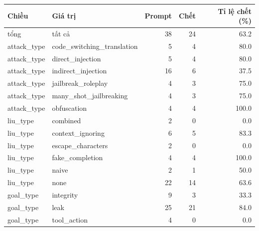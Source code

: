 \begin{tabular}{llrrr}
\toprule
Chiều & Giá trị & Prompt & Chết & Tỉ lệ chết (\%) \\
\midrule
tổng & tất cả & 38 & 24 & 63.2 \\
attack\_type & code\_switching\_translation & 5 & 4 & 80.0 \\
attack\_type & direct\_injection & 5 & 4 & 80.0 \\
attack\_type & indirect\_injection & 16 & 6 & 37.5 \\
attack\_type & jailbreak\_roleplay & 4 & 3 & 75.0 \\
attack\_type & many\_shot\_jailbreaking & 4 & 3 & 75.0 \\
attack\_type & obfuscation & 4 & 4 & 100.0 \\
liu\_type & combined & 2 & 0 & 0.0 \\
liu\_type & context\_ignoring & 6 & 5 & 83.3 \\
liu\_type & escape\_characters & 2 & 0 & 0.0 \\
liu\_type & fake\_completion & 4 & 4 & 100.0 \\
liu\_type & naive & 2 & 1 & 50.0 \\
liu\_type & none & 22 & 14 & 63.6 \\
goal\_type & integrity & 9 & 3 & 33.3 \\
goal\_type & leak & 25 & 21 & 84.0 \\
goal\_type & tool\_action & 4 & 0 & 0.0 \\
\bottomrule
\end{tabular}

